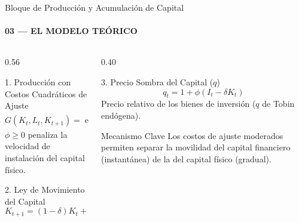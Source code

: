 \documentclass[aspectratio=169, 10pt]{beamer}
\begin{document}
\begin{frame}{Bloque de Producción y Acumulación de Capital}
    \framesubtitle{03 --- EL MODELO TEÓRICO}
    \begin{columns}[T]
        \begin{column}{0.56\textwidth}
            \begin{block}{1. Producción con Costos Cuadráticos de Ajuste}
                \small
                \begin{equation}
                    G(K_t, L_t, K_{t+1}) = \exp(e_t)\, K_t^{\alpha} L_t^{1-\alpha} - \frac{\phi}{2}\left(K_{t+1}-K_t\right)^{2}
                \end{equation}
                \scriptsize
                $\phi \ge 0$ penaliza la velocidad de instalación del capital físico.
            \end{block}

            \begin{block}{2. Ley de Movimiento del Capital}
                \small
                \begin{equation}
                    K_{t+1} = (1-\delta)K_t + I_t
                \end{equation}
            \end{block}
        \end{column}

        \begin{column}{0.40\textwidth}
            \begin{block}{3. Precio Sombra del Capital ($q$)}
                \small
                \begin{equation}
                    q_t = 1 + \phi\left(I_t - \delta K_t\right)
                \end{equation}
                \scriptsize
                Precio relativo de los bienes de inversión ($q$ de Tobin endógena).
            \end{block}

            \begin{exampleblock}{Mecanismo Clave}
                \scriptsize
                Los costos de ajuste moderados permiten separar la movilidad del capital financiero (instantánea) de la del capital físico (gradual).
            \end{exampleblock}
        \end{column}
    \end{columns}
\end{frame}
\end{document}
